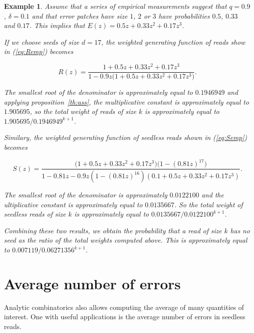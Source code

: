 \documentclass{article}
\newtheorem{example}{Example}
\begin{document}
\begin{example}
Assume that a series of empirical measurements suggest that $q = 0.9$,
$\delta = 0.1$ and that error patches have size $1$, $2$ or $3$ have
probabilities $0.5$, $0.33$ and $0.17$. This implies that $E(z) = 0.5z +
0.33z^2+0.17z^3$.

If we choose seeds of size $d=17$, the weighted generating function of
reads show in (\ref{eq:Remp}) becomes

\begin{equation*}
R(z) = \frac{1+0.5z +0.33z^2+0.17z^3}
{1-0.9z\big(1+0.5z +0.33z^2+0.17z^3\big)}.
\end{equation*}

The smallest root of the denominator is approximately equal to $0.1946949$
and applying proposition~\ref{th:ass}, the multiplicative constant is
approximately equal to $1.905695$, so the total weight of reads of size
$k$ is approximately equal to $1.905695/0.1946949^{k+1}$.

Similary, the weighted generating function of seedless reads shown in
(\ref{eq:Semp}) becomes

\begin{equation*}
S(z) = \frac{\big(1+0.5z +0.33z^2+0.17z^3\big)\big( 1-(0.81z)^{17} \big)}
{1-0.81z-0.9z(1-(0.81z)^{16})(0.1+0.5z +0.33z^2+0.17z^3)}.
\end{equation*}

The smallest root of the denominator is approximately $0.0122100$ and the
ultiplicative constant is approximately equal to $0.0135667$. So the total
weight of seedless reads of size $k$ is approximately equal to $0.0135667
/ 0.0122100^{k+1}$.

Combining these two results, we obtain the probability that a read of size
$k$ has no seed as the ratio of the total weights computed above. This is
approximately equal to $0.007119 / 0.06271356^{k+1}$.
\end{example}









\section{Average number of errors}

Analytic combinatorics also allows computing the average of many
quantities of interest. One with useful applications is the average
number of errors in seedless reads.
\end{document}
